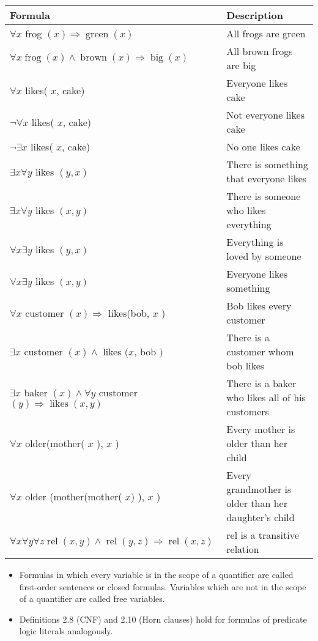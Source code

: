 \documentclass[10pt]{article}
\begin{document}
\begin{center}
\begin{tabular}{|l|l|}
\hline
Formula & Description \\
\hline
$\forall x$ frog $(x) \Rightarrow \operatorname{green}(x)$ & All frogs are green \\
\hline
$\forall x \operatorname{frog}(x) \wedge \operatorname{brown}(x) \Rightarrow \operatorname{big}(x)$ & All brown frogs are big \\
\hline
$\forall x$ likes( $x$, cake) & Everyone likes cake \\
\hline
$\neg \forall x$ likes( $x$, cake) & Not everyone likes cake \\
\hline
$\neg \exists x$ likes( $x$, cake) & No one likes cake \\
\hline
$\exists x \forall y$ likes $(y, x)$ & There is something that everyone likes \\
\hline
$\exists x \forall y$ likes $(x, y)$ & There is someone who likes everything \\
\hline
$\forall x \exists y$ likes $(y, x)$ & Everything is loved by someone \\
\hline
$\forall x \exists y$ likes $(x, y)$ & Everyone likes something \\
\hline
$\forall x$ customer $(x) \Rightarrow$ likes(bob, $x$ ) & Bob likes every customer \\
\hline
$\exists x$ customer $(x) \wedge$ likes $(x$, bob $)$ & There is a customer whom bob likes \\
\hline
$\exists x$ baker $(x) \wedge \forall y$ customer $(y) \Rightarrow \operatorname{likes}(x, y)$ & There is a baker who likes all of his customers \\
\hline
$\forall x$ older(mother( $x$ ), $x$ ) & Every mother is older than her child \\
\hline
$\forall x$ older (mother(mother( $x)$ ), $x$ ) & Every grandmother is older than her daughter's child \\
\hline
$\forall x \forall y \forall z \operatorname{rel}(x, y) \wedge \operatorname{rel}(y, z) \Rightarrow \operatorname{rel}(x, z)$ & rel is a transitive relation \\
\hline
\end{tabular}
\end{center}

\begin{itemize}
  \item Formulas in which every variable is in the scope of a quantifier are called first-order sentences or closed formulas. Variables which are not in the scope of a quantifier are called free variables.
  \item Definitions 2.8 (CNF) and 2.10 (Horn clauses) hold for formulas of predicate logic literals analogously.
\end{itemize}
\end{document}
